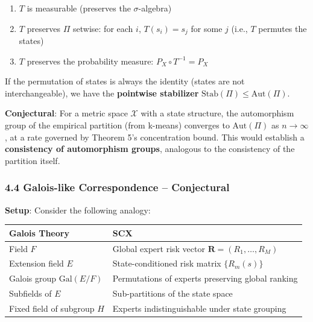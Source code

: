 \documentclass[
  12pt,
]{ctexart}
\providecommand{\tightlist}{%
  \setlength{\itemsep}{0pt}\setlength{\parskip}{0pt}}
\begin{document}
\begin{enumerate}
\def\labelenumi{\arabic{enumi}.}
\tightlist
\item
  \(T\) is measurable (preserves the \(\sigma\)-algebra)
\item
  \(T\) preserves \(\Pi\) setwise: for each \(i\), \(T(s_i) = s_j\) for
  some \(j\) (i.e., \(T\) permutes the states)
\item
  \(T\) preserves the probability measure: \(P_X \circ T^{-1} = P_X\)
\end{enumerate}

If the permutation of states is always the identity (states are not
interchangeable), we have the \textbf{pointwise stabilizer}
\(\text{Stab}(\Pi) \leq \text{Aut}(\Pi)\).

\textbf{Conjectural}: For a metric space \(\mathcal{X}\) with a state
structure, the automorphism group of the empirical partition (from
k-means) converges to \(\text{Aut}(\Pi)\) as \(n \to \infty\), at a rate
governed by Theorem 5's concentration bound. This would establish a
\textbf{consistency of automorphism groups}, analogous to the
consistency of the partition itself.

\subsubsection{4.4 Galois-like Correspondence --
Conjectural}\label{galois-like-correspondence-conjectural}

\textbf{Setup}: Consider the following analogy:

\begin{longtable}[]{@{}
  >{\raggedright\arraybackslash}p{}
  >{\raggedright\arraybackslash}p{}@{}}
\toprule\noalign{}
\begin{minipage}[b]{\linewidth}\raggedright
Galois Theory
\end{minipage} & \begin{minipage}[b]{\linewidth}\raggedright
SCX
\end{minipage} \\
\midrule\noalign{}
\endhead
\bottomrule\noalign{}
\endlastfoot
Field \(F\) & Global expert risk vector
\(\mathbf{R} = (R_1, \dots, R_M)\) \\
Extension field \(E\) & State-conditioned risk matrix \(\{R_m(s)\}\) \\
Galois group \(\text{Gal}(E/F)\) & Permutations of experts preserving
global ranking \\
Subfields of \(E\) & Sub-partitions of the state space \\
Fixed field of subgroup \(H\) & Experts indistinguishable under state
grouping \\
\end{longtable}
\end{document}
